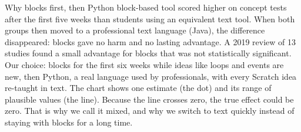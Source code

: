 \documentclass[20pt,t]{beamer}
\begin{document}
\begin{frame}{Why blocks first, then Python}
{    block-based tool scored higher on concept tests after the first five weeks than students
    using an equivalent text tool. When both groups then moved to a professional text language
    (Java), the difference disappeared: blocks gave no harm and no lasting advantage. A 2019
    review of 13 studies found a small advantage for blocks that was not statistically
    significant. Our choice: blocks for the first six weeks while ideas like loops and events are
    new, then Python, a real language used by professionals, with every Scratch idea re-taught in
    text.}
  {The chart shows one estimate (the dot) and its range of plausible values (the line). Because
    the line crosses zero, the true effect could be zero. That is why we call it mixed, and why
    we switch to text quickly instead of staying with blocks for a long time.}
  {}
\end{frame}
\end{document}
